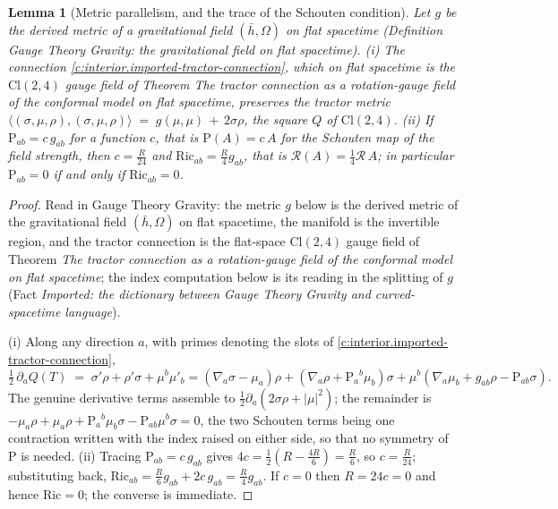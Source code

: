 \documentclass[11pt]{article}
\newtheorem{lemma}[theorem]{Lemma}
\theoremstyle{definition}
\theoremstyle{plain}
\newcommand{\changedmark}[2]{\marginpar{\raggedright\scriptsize\color{#1}#2}}
\providecommand{\Cl}{}\renewcommand{\Cl}{\mathrm{Cl}}
\providecommand{\Ric}{}\renewcommand{\Ric}{\mathrm{Ric}}
\providecommand{\Sch}{}\renewcommand{\Sch}{\mathrm{P}}
\providecommand{\hb}{}\renewcommand{\hb}{\bar{h}}
\providecommand{\ip}{}\renewcommand{\ip}[2]{\langle #1, #2\rangle}
\begin{document}
\begin{lemma}[Metric parallelism, and the trace of the Schouten condition]\label{c:interior.metric-parallelism-trace-schouten-condition}
\changedmark{gray}{reworded}
Let $g$ be the derived metric of a gravitational field $(\hb, \Omega)$ on flat spacetime (Definition \emph{Gauge Theory Gravity: the gravitational field on flat spacetime}). (i) The connection \ref{c:interior.imported-tractor-connection}, which on flat spacetime is the $\Cl(2,4)$ gauge field of Theorem \emph{The tractor connection as a rotation-gauge field of the conformal model on flat spacetime}, preserves the tractor metric $\ip{(\sigma,\mu,\rho)}{(\sigma,\mu,\rho)} \;=\; g(\mu,\mu) \,+\, 2\sigma\rho$, the square $Q$ of $\Cl(2,4)$. (ii) If $\Sch_{ab} = c\, g_{ab}$ for a function $c$, that is $\Sch(A) = c\,A$ for the Schouten map of the field strength, then $c = \tfrac{R}{24}$ and $\Ric_{ab} = \tfrac{R}{4} g_{ab}$, that is $\mathcal{R}(A) = \tfrac14\mathcal{R}\,A$; in particular $\Sch_{ab} = 0$ if and only if $\Ric_{ab} = 0$.
\end{lemma}
\begin{proof}
Read in Gauge Theory Gravity: the metric $g$ below is the derived metric of the gravitational field $(\hb, \Omega)$ on flat spacetime, the manifold is the invertible region, and the tractor connection is the flat-space $\Cl(2,4)$ gauge field of Theorem \emph{The tractor connection as a rotation-gauge field of the conformal model on flat spacetime}; the index computation below is its reading in the splitting of $g$ (Fact \emph{Imported: the dictionary between Gauge Theory Gravity and curved-spacetime language}).

(i) Along any direction $a$, with primes denoting the slots of \ref{c:interior.imported-tractor-connection},
\[
\tfrac12\,\partial_a Q(T) \;=\; \sigma'\rho + \rho'\sigma + \mu^b\mu'_b
= (\nabla_a\sigma - \mu_a)\rho + (\nabla_a\rho + \Sch_a{}^b\mu_b)\sigma + \mu^b(\nabla_a\mu_b + g_{ab}\rho - \Sch_{ab}\sigma).
\]
The genuine derivative terms assemble to $\tfrac12\partial_a(2\sigma\rho + |\mu|^2)$; the remainder is $-\mu_a\rho + \mu_a \rho + \Sch_a{}^b\mu_b\sigma - \Sch_{ab}\mu^b\sigma = 0$, the two Schouten terms being one contraction written with the index raised on either side, so that no symmetry of $\Sch$ is needed.
(ii) Tracing $\Sch_{ab} = c\,g_{ab}$ gives $4c = \tfrac12(R - \tfrac{4R}{6}) = \tfrac{R}{6}$, so $c = \tfrac{R}{24}$; substituting back, $\Ric_{ab} = \tfrac{R}{6}g_{ab} + 2c\,g_{ab} = \tfrac{R}{4}g_{ab}$. If $c = 0$ then $R = 24c = 0$ and hence $\Ric = 0$; the converse is immediate.

\end{proof}
\end{document}
